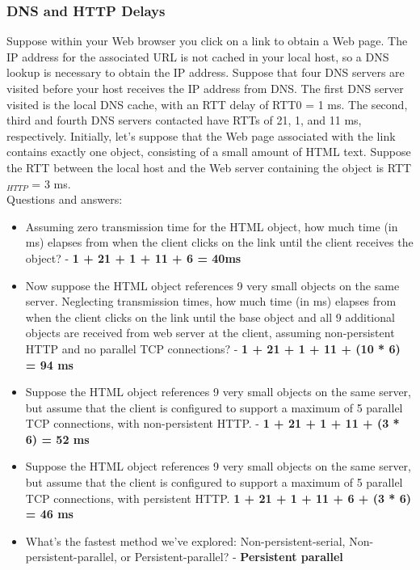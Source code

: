 \documentclass{article}
\begin{document}
\subsubsection{DNS and HTTP Delays}
Suppose within your Web browser you click on a link to obtain a Web page. The IP address for the associated URL is not cached in your local host, so a DNS lookup is necessary to obtain the IP address. Suppose that four DNS servers are visited before your host receives the IP address from DNS. The first DNS server visited is the local DNS cache, with an RTT delay of RTT0 = 1 ms. The second, third and fourth DNS servers contacted have RTTs of 21, 1, and 11 ms, respectively. Initially, let's suppose that the Web page associated with the link contains exactly one object, consisting of a small amount of HTML text. Suppose the RTT between the local host and the Web server containing the object is RTT$_{HTTP}$ = 3 ms. \\

\noindent Questions and answers:

\begin{itemize}
	\item Assuming zero transmission time for the HTML object, how much time (in ms) elapses from when the client clicks on the link until the client receives the object? - \textbf{1 + 21 + 1 + 11 + 6 = 40ms}
	\item Now suppose the HTML object references 9 very small objects on the same server. Neglecting transmission times, how much time (in ms) elapses from when the client clicks on the link until the base object and all 9 additional objects are received from web server at the client, assuming non-persistent HTTP and no parallel TCP connections? - \textbf{1 + 21 + 1 + 11 + (10 * 6) = 94 ms}
	\item Suppose the HTML object references 9 very small objects on the same server, but assume that the client is configured to support a maximum of 5 parallel TCP connections, with non-persistent HTTP. - \textbf{1 + 21 + 1 + 11 + (3 * 6) = 52 ms}
	\item Suppose the HTML object references 9 very small objects on the same server, but assume that the client is configured to support a maximum of 5 parallel TCP connections, with persistent HTTP. \textbf{1 + 21 + 1 + 11 + 6 + (3 * 6) = 46 ms}
	\item What's the fastest method we've explored: Non-persistent-serial, Non-persistent-parallel, or Persistent-parallel? - \textbf{Persistent parallel}
\end{itemize}
\end{document}
